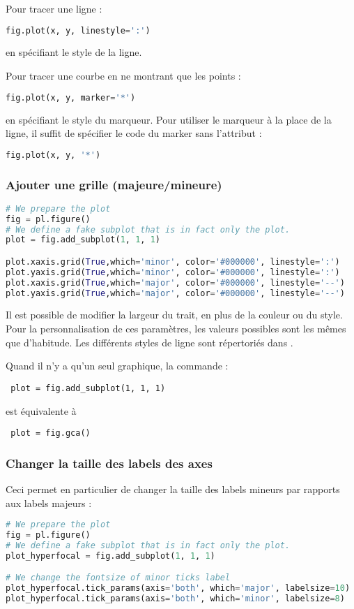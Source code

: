 \documentclass[a4paper,twoside]{article}
\begin{document}
Pour tracer une ligne : 
\begin{lstlisting}[language=python]
fig.plot(x, y, linestyle=':')
\end{lstlisting}
en spécifiant le style de la ligne. 

Pour tracer une courbe en ne montrant que les points : 
\begin{lstlisting}[language=python]
fig.plot(x, y, marker='*')
\end{lstlisting}
en spécifiant le style du marqueur. Pour utiliser le marqueur à la place de la ligne, il suffit de spécifier le code du marker sans l'attribut : 
\begin{lstlisting}[language=python]
fig.plot(x, y, '*')
\end{lstlisting}

\subsubsection{Ajouter une grille (majeure/mineure)}
\begin{lstlisting}[language=python]
# We prepare the plot
fig = pl.figure()
# We define a fake subplot that is in fact only the plot.
plot = fig.add_subplot(1, 1, 1)

plot.xaxis.grid(True,which='minor', color='#000000', linestyle=':')
plot.yaxis.grid(True,which='minor', color='#000000', linestyle=':')
plot.xaxis.grid(True,which='major', color='#000000', linestyle='--')
plot.yaxis.grid(True,which='major', color='#000000', linestyle='--')
\end{lstlisting}

Il est possible de modifier la largeur du trait, en plus de la couleur ou du style. Pour la personnalisation de ces paramètres, les valeurs possibles sont les mêmes que d'habitude. Les différents styles de ligne sont répertoriés dans .

\begin{remarque}
 Quand il n'y a qu'un seul graphique, la commande :
\begin{verbatim}
 plot = fig.add_subplot(1, 1, 1)
\end{verbatim}
est équivalente à 
\begin{verbatim}
 plot = fig.gca()
\end{verbatim}
\end{remarque}


\subsubsection{Changer la taille des labels des axes}
Ceci permet en particulier de changer la taille des labels mineurs par rapports aux labels majeurs :
\begin{lstlisting}[language=python]
# We prepare the plot
fig = pl.figure()
# We define a fake subplot that is in fact only the plot.
plot_hyperfocal = fig.add_subplot(1, 1, 1)

# We change the fontsize of minor ticks label
plot_hyperfocal.tick_params(axis='both', which='major', labelsize=10)
plot_hyperfocal.tick_params(axis='both', which='minor', labelsize=8)
\end{lstlisting}
\end{document}
